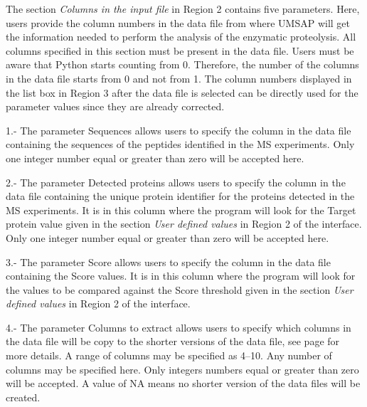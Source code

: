 The section \textit{Columns in the input file} in Region \num{2} contains five parameters. Here, users provide the column numbers in the data file from where UMSAP will get the information needed to perform the analysis of the enzymatic proteolysis. All columns specified  in this section must be present in the data file. Users must be aware that Python starts counting from \num{0}. Therefore, the number of the columns in the data file starts from \num{0} and not from \num{1}. The column numbers displayed in the list box in Region \num{3} after the data file is selected can be directly used for the parameter values since they are already corrected.  

\num{1}.- The parameter Sequences allows users to specify the column in the data file containing the sequences of the peptides identified in the MS experiments. Only one integer number equal or greater than zero will be accepted here.

\num{2}.- The parameter Detected proteins allows users to specify the column in the data file containing the unique protein identifier for the proteins detected in the MS experiments. It is in this column where the program will look for the Target protein value given in the section \textit{User defined values} in Region \num{2} of the interface. Only one integer number equal or greater than zero will be accepted here.

\num{3}.- The parameter Score allows users to specify the column in the data file containing the Score values. It is in this column where the program will look for the values to be compared against the Score threshold given in the section \textit{User defined values} in Region \num{2} of the interface.

\num{4}.- The parameter Columns to extract\label{par:enzdigColExt} allows users to specify which columns in the data file will be copy to the shorter versions of the data file, see page \pageref{par:datafilesenzdig} for more details. A range of columns may be specified as \numrange[range-phrase = --]{4}{10}. Any number of columns may be specified here. Only integers numbers equal or greater than zero will be accepted. A value of NA means no shorter version of the data files will be created.


